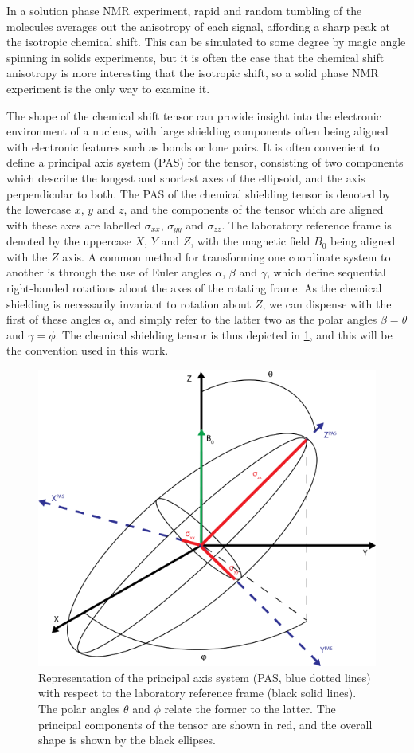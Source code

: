 \begin{refsection}
In a solution phase NMR experiment, rapid and random tumbling of the molecules averages out the anisotropy of each signal, affording a sharp peak at the isotropic chemical shift.
This can be simulated to some degree by magic angle spinning in solids experiments, but it is often the case that the chemical shift anisotropy is more interesting that the isotropic shift, so a solid phase NMR experiment is the only way to examine it.

The shape of the chemical shift tensor can provide insight into the electronic environment of a nucleus, with large shielding components often being aligned with electronic features such as bonds or lone pairs.
It is often convenient to define a principal axis system (PAS) for the tensor, consisting of two components which describe the longest and shortest axes of the ellipsoid, and the axis perpendicular to both.
The PAS of the chemical shielding tensor is denoted by the lowercase $x$, $y$ and $z$, and the components of the tensor which are aligned with these axes are labelled $\sigma_{xx}$, $\sigma_{yy}$ and $\sigma_{zz}$.
The laboratory reference frame is denoted by the uppercase $X$, $Y$ and $Z$, with the magnetic field $B_0$ being aligned with the $Z$ axis.
A common method for transforming one coordinate system to another is through the use of Euler angles $\alpha$, $\beta$ and $\gamma$, which define sequential right-handed rotations about the axes of the rotating frame.
As the chemical shielding is necessarily invariant to rotation about $Z$, we can dispense with the first of these angles $\alpha$, and simply refer to the latter two as the polar angles $\beta = \theta$ and $\gamma = \phi$.
The chemical shielding tensor is thus depicted in \cref{fig:chemical-shielding-tensor}, and this will be the convention used in this work.

\begin{figure}
  \centering
  \includegraphics[width=0.4\linewidth]{Figures/Chemical_Shift_Tensor.png}
  \caption[Principal axis system with respect to laboratory reference.]{Representation of the principal axis system (PAS, blue dotted lines) with respect to the laboratory reference frame (black solid lines). The polar angles $\theta$ and $\phi$ relate the former to the latter. The principal components of the tensor are shown in red, and the overall shape is shown by the black ellipses.}
  \label{fig:chemical-shielding-tensor}
\end{figure}


\end{refsection}
